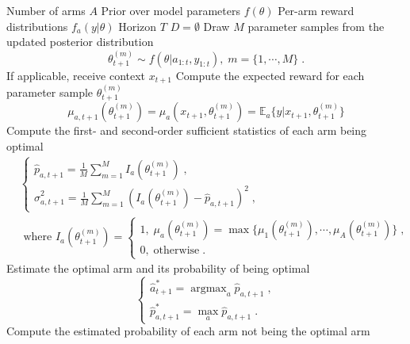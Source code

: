 \documentclass[10pt]{article}
\newcommand{\argmax}{\mathop{\mathrm{argmax}}}
\begin{document}
\begin{algorithm}
	\begin{algorithmic}
		\Require Number of arms $A$
		\Require Prior over model parameters $f(\theta)$
		\Require Per-arm reward distributions $f_a(y|\theta)$
		\Require Horizon $T$
		\State $D=\emptyset$
		\State Draw $M$ parameter samples from the updated posterior distribution
		\begin{equation}
		\theta_{t+1}^{(m)}\sim f(\theta|a_{1:t}, y_{1:t}), \; m=\{1, \cdots, M\} \; .
		\end{equation}
		\State If applicable, receive context $x_{t+1}$
		\State Compute the expected reward for each parameter sample $\theta_{t+1}^{(m)}$
		\begin{equation}
		\mu_{a,t+1}(\theta_{t+1}^{(m)})=\mu_{a}(x_{t+1},\theta_{t+1}^{(m)})=\mathbb{E}_{a}\{y|x_{t+1},\theta_{t+1}^{(m)}\}
		\end{equation}
		\State Compute the first- and second-order sufficient statistics of each arm being optimal
		\begin{equation}
		\begin{split}
		&\begin{cases}
		\hat{p}_{a,t+1}=\frac{1}{M}\sum_{m=1}^M I_a\left(\theta_{t+1}^{(m)}\right) \; , \\
		\hat{\sigma}^2_{a,t+1}=\frac{1}{M} \sum_{m=1}^M \left(I_a\left(\theta_{t+1}^{(m)}\right)- \hat{p}_{a,t+1} \right)^2 \; ,
		\end{cases} \\
		&\text{ where }I_a(\theta_{t+1}^{(m)}) = \begin{cases}
		1, \; \mu_{a}(\theta_{t+1}^{(m)})=\max\{\mu_1(\theta_{t+1}^{(m)}), \cdots, \mu_A(\theta_{t+1}^{(m)})\} \;, \\
		0, \; \text{otherwise} \;.
		\end{cases}
		\end{split}
		\end{equation}
		\EndFor
		\State Estimate the optimal arm and its probability of being optimal
		\begin{equation}
		\begin{cases}
		\hat{a}_{t+1}^* =\argmax_{a} \hat{p}_{a,t+1} \; ,  \\
		\hat{p}^*_{a,t+1}=\max_{a} \hat{p}_{a,t+1} \; .
		\end{cases}
		\end{equation}
		\State Compute the estimated probability of each arm not being the optimal arm

\end{algorithmic}
\end{algorithm}
\end{document}
